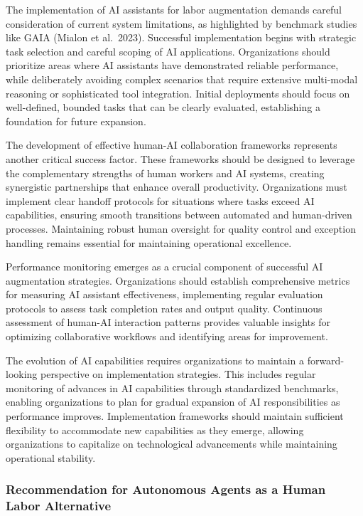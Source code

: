 \documentclass[
]{article}
\begin{document}
The implementation of AI assistants for labor augmentation demands
careful consideration of current system limitations, as highlighted by
benchmark studies like GAIA (Mialon et al.~2023). Successful
implementation begins with strategic task selection and careful scoping
of AI applications. Organizations should prioritize areas where AI
assistants have demonstrated reliable performance, while deliberately
avoiding complex scenarios that require extensive multi-modal reasoning
or sophisticated tool integration. Initial deployments should focus on
well-defined, bounded tasks that can be clearly evaluated, establishing
a foundation for future expansion.

The development of effective human-AI collaboration frameworks
represents another critical success factor. These frameworks should be
designed to leverage the complementary strengths of human workers and AI
systems, creating synergistic partnerships that enhance overall
productivity. Organizations must implement clear handoff protocols for
situations where tasks exceed AI capabilities, ensuring smooth
transitions between automated and human-driven processes. Maintaining
robust human oversight for quality control and exception handling
remains essential for maintaining operational excellence.

Performance monitoring emerges as a crucial component of successful AI
augmentation strategies. Organizations should establish comprehensive
metrics for measuring AI assistant effectiveness, implementing regular
evaluation protocols to assess task completion rates and output quality.
Continuous assessment of human-AI interaction patterns provides valuable
insights for optimizing collaborative workflows and identifying areas
for improvement.

The evolution of AI capabilities requires organizations to maintain a
forward-looking perspective on implementation strategies. This includes
regular monitoring of advances in AI capabilities through standardized
benchmarks, enabling organizations to plan for gradual expansion of AI
responsibilities as performance improves. Implementation frameworks
should maintain sufficient flexibility to accommodate new capabilities
as they emerge, allowing organizations to capitalize on technological
advancements while maintaining operational stability.

\subsubsection{Recommendation for Autonomous Agents as a Human Labor
Alternative}\label{recommendation-for-autonomous-agents-as-a-human-labor-alternative}
\end{document}
